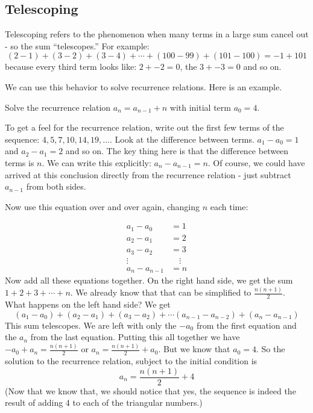 \documentclass[12pt]{article}
\begin{document}
\subsection{Telescoping}

Telescoping refers to the phenomenon when many terms in a large sum cancel out - so the sum ``telescopes.''  For example:
\[(2 - 1) + (3 - 2) + (3 - 4) + \cdots + (100 - 99) + (101 - 100) = -1 + 101\]
because every third term looks like: $2 + -2 = 0$, the $3 + -3 = 0$ and so on.

We can use this behavior to solve recurrence relations.  Here is an example.

\begin{example}
  Solve the recurrence relation $a_n = a_{n-1} + n$ with initial term $a_0 = 4$.  
  
  \begin{solution}
    To get a feel for the recurrence relation, write out the first few terms of the sequence: $4, 5, 7, 10, 14, 19, \ldots$.  Look at the difference between terms.  $a_1 - a_0 = 1$ and $a_2 - a_1 = 2$ and so on.  The key thing here is that the difference between terms is $n$.  We can write this explicitly: $a_n - a_{n-1} = n$.  Of course, we could have arrived at this conclusion directly from the recurrence relation - just subtract $a_{n-1}$ from both sides.
    
    Now use this equation over and over again, changing $n$ each time:
    
    \begin{align*}
      a_1 - a_0 &= 1\\
      a_2 - a_1 &= 2\\
      a_3 - a_2 & = 3\\
      \vdots \quad & \quad \vdots \\
      a_n - a_{n-1} & = n
    \end{align*}
  Now add all these equations together.  On the right hand side, we get the sum $1 + 2 + 3 + \cdots + n$.  We already know that that can be simplified to $\frac{n(n+1)}{2}$.  What happens on the left hand side?  We get 
  \[(a_1 - a_0) + (a_2 - a_1) + (a_3 - a_2) + \cdots (a_{n-1} - a_{n-2})+ (a_n - a_{n-1})\]
  This sum telescopes.  We are left with only the $-a_0$ from the first equation and the $a_n$ from the last equation.  Putting this all together we have $-a_0 + a_n = \frac{n(n+1)}{2}$ or $a_n = \frac{n(n+1)}{2} + a_0$.  But we know that $a_0 = 4$.  So the solution to the recurrence relation, subject to the initial condition is
  \[a_n = \frac{n(n+1)}{2} + 4\]
  (Now that we know that, we should notice that yes, the sequence is indeed the result of adding 4 to each of the triangular numbers.)
  \end{solution}

\end{example}
\end{document}
